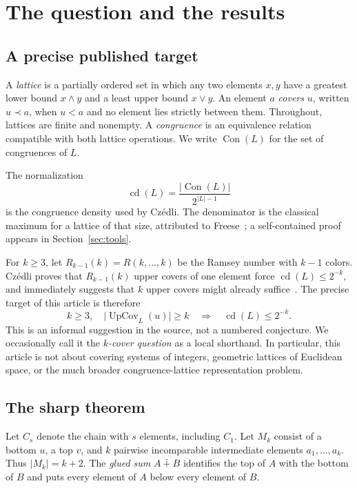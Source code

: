 \documentclass[11pt,a4paper]{article}
\numberwithin{equation}{section}
\theoremstyle{definition}
\theoremstyle{remark}
\DeclareMathOperator{\Con}{Con}
\DeclareMathOperator{\UpCov}{UpCov}
\DeclareMathOperator{\cdens}{cd}
\newcommand{\glue}{\mathbin{\dotplus}}
\newcommand{\card}[1]{\lvert #1\rvert}
\begin{document}
\section{The question and the results}
\subsection{A precise published target}
A \emph{lattice} is a partially ordered set in which any two elements $x,y$ have
a greatest lower bound $x\wedge y$ and a least upper bound $x\vee y$.
An element $a$ \emph{covers} $u$, written $u\prec a$, when $u<a$ and no element
lies strictly between them. Throughout, lattices are finite and nonempty.
A \emph{congruence} is an equivalence relation compatible with both lattice
operations. We write $\Con(L)$ for the set of congruences of $L$.

The normalization
\begin{equation}\label{eq:density}
  \cdens(L)=\frac{\card{\Con(L)}}{2^{\card L-1}}
\end{equation}
is the congruence density used by Cz\'edli. The denominator is the classical
maximum for a lattice of that size, attributed to Freese~\cite{freese}; a
self-contained proof appears in Section~\ref{sec:tools}.

For $k\ge3$, let $R_{k-1}(k)=R(k,\ldots,k)$ be the Ramsey number with $k-1$
colors. Cz\'edli proves that $R_{k-1}(k)$ upper covers of one element force
$\cdens(L)\le2^{-k}$, and immediately suggests that $k$ upper covers might
already suffice~\cite[Lemma~4.4 and the following sentence, p.~8]{czedli}.
The precise target of this article is therefore
\begin{equation}\label{eq:target}
 k\ge3,\quad \card{\UpCov_L(u)}\ge k
 \quad\Longrightarrow\quad \cdens(L)\le2^{-k}.
\end{equation}
This is an informal suggestion in the source, not a numbered conjecture.
We occasionally call it the \emph{$k$-cover question} as a local shorthand.
In particular, this article is not about covering systems of integers, geometric
lattices of Euclidean space, or the much broader congruence-lattice representation
problem.

\subsection{The sharp theorem}
Let $C_s$ denote the chain with $s$ elements, including $C_1$.
Let $M_k$ consist of a bottom $u$, a top $v$, and $k$ pairwise incomparable
intermediate elements $a_1,\ldots,a_k$. Thus $\card{M_k}=k+2$.
The \emph{glued sum} $A\glue B$ identifies the top of $A$ with the bottom of $B$
and puts every element of $A$ below every element of $B$.
\end{document}

